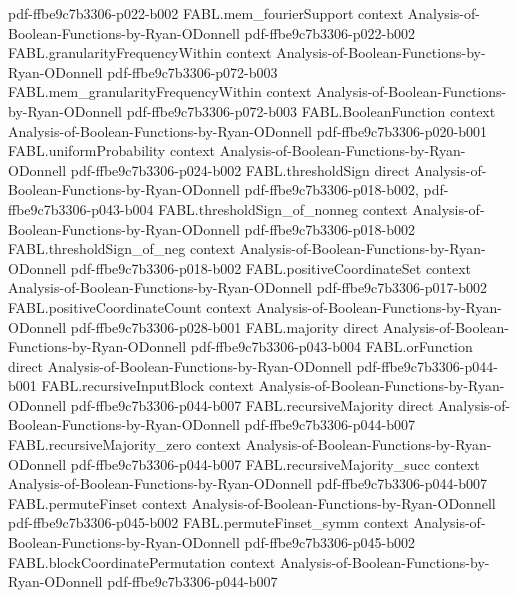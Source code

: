 \begin{theorem}
  {pdf-ffbe9c7b3306-p022-b002}
\proofstep
  {FABL.mem_fourierSupport}
  {context}
  {Analysis-of-Boolean-Functions-by-Ryan-ODonnell}
  {pdf-ffbe9c7b3306-p022-b002}
\proofstep
  {FABL.granularityFrequencyWithin}
  {context}
  {Analysis-of-Boolean-Functions-by-Ryan-ODonnell}
  {pdf-ffbe9c7b3306-p072-b003}
\proofstep
  {FABL.mem_granularityFrequencyWithin}
  {context}
  {Analysis-of-Boolean-Functions-by-Ryan-ODonnell}
  {pdf-ffbe9c7b3306-p072-b003}
\proofstep
  {FABL.BooleanFunction}
  {context}
  {Analysis-of-Boolean-Functions-by-Ryan-ODonnell}
  {pdf-ffbe9c7b3306-p020-b001}
\proofstep
  {FABL.uniformProbability}
  {context}
  {Analysis-of-Boolean-Functions-by-Ryan-ODonnell}
  {pdf-ffbe9c7b3306-p024-b002}
\proofstep
  {FABL.thresholdSign}
  {direct}
  {Analysis-of-Boolean-Functions-by-Ryan-ODonnell}
  {pdf-ffbe9c7b3306-p018-b002,
    pdf-ffbe9c7b3306-p043-b004}
\proofstep
  {FABL.thresholdSign_of_nonneg}
  {context}
  {Analysis-of-Boolean-Functions-by-Ryan-ODonnell}
  {pdf-ffbe9c7b3306-p018-b002}
\proofstep
  {FABL.thresholdSign_of_neg}
  {context}
  {Analysis-of-Boolean-Functions-by-Ryan-ODonnell}
  {pdf-ffbe9c7b3306-p018-b002}
\proofstep
  {FABL.positiveCoordinateSet}
  {context}
  {Analysis-of-Boolean-Functions-by-Ryan-ODonnell}
  {pdf-ffbe9c7b3306-p017-b002}
\proofstep
  {FABL.positiveCoordinateCount}
  {context}
  {Analysis-of-Boolean-Functions-by-Ryan-ODonnell}
  {pdf-ffbe9c7b3306-p028-b001}
\proofstep
  {FABL.majority}
  {direct}
  {Analysis-of-Boolean-Functions-by-Ryan-ODonnell}
  {pdf-ffbe9c7b3306-p043-b004}
\proofstep
  {FABL.orFunction}
  {direct}
  {Analysis-of-Boolean-Functions-by-Ryan-ODonnell}
  {pdf-ffbe9c7b3306-p044-b001}
\proofstep
  {FABL.recursiveInputBlock}
  {context}
  {Analysis-of-Boolean-Functions-by-Ryan-ODonnell}
  {pdf-ffbe9c7b3306-p044-b007}
\proofstep
  {FABL.recursiveMajority}
  {direct}
  {Analysis-of-Boolean-Functions-by-Ryan-ODonnell}
  {pdf-ffbe9c7b3306-p044-b007}
\proofstep
  {FABL.recursiveMajority_zero}
  {context}
  {Analysis-of-Boolean-Functions-by-Ryan-ODonnell}
  {pdf-ffbe9c7b3306-p044-b007}
\proofstep
  {FABL.recursiveMajority_succ}
  {context}
  {Analysis-of-Boolean-Functions-by-Ryan-ODonnell}
  {pdf-ffbe9c7b3306-p044-b007}
\proofstep
  {FABL.permuteFinset}
  {context}
  {Analysis-of-Boolean-Functions-by-Ryan-ODonnell}
  {pdf-ffbe9c7b3306-p045-b002}
\proofstep
  {FABL.permuteFinset_symm}
  {context}
  {Analysis-of-Boolean-Functions-by-Ryan-ODonnell}
  {pdf-ffbe9c7b3306-p045-b002}
\proofstep
  {FABL.blockCoordinatePermutation}
  {context}
  {Analysis-of-Boolean-Functions-by-Ryan-ODonnell}
  {pdf-ffbe9c7b3306-p044-b007}

\end{theorem}

